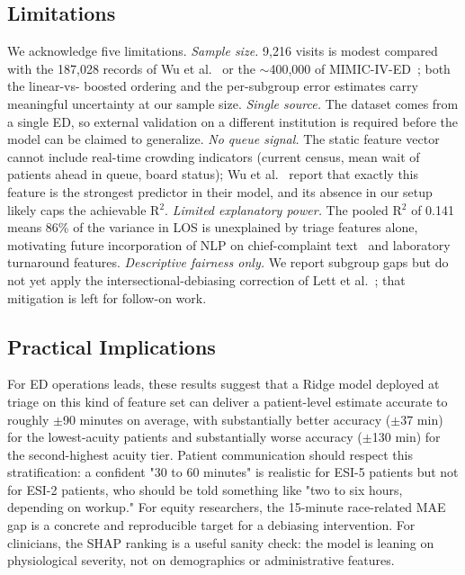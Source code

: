 \documentclass[conference]{IEEEtran}
\begin{document}
\subsection{Limitations}
We acknowledge five limitations. \textit{Sample size.} 9{,}216 visits is
modest compared with the 187{,}028 records of Wu et al.~\cite{wu2025} or
the $\sim$400{,}000 of MIMIC-IV-ED~\cite{xie2022}; both the linear-vs-
boosted ordering and the per-subgroup error estimates carry meaningful
uncertainty at our sample size. \textit{Single source.} The dataset comes
from a single ED, so external validation on a different institution is
required before the model can be claimed to generalize. \textit{No queue
signal.} The static feature vector cannot include real-time crowding
indicators (current census, mean wait of patients ahead in queue, board
status); Wu et al.~\cite{wu2025} report that exactly this feature is the
strongest predictor in their model, and its absence in our setup likely
caps the achievable R$^2$. \textit{Limited explanatory power.} The pooled
R$^2$ of 0.141 means 86\% of the variance in LOS is unexplained by triage
features alone, motivating future incorporation of NLP on chief-complaint
text~\cite{seo2024} and laboratory turnaround features. \textit{Descriptive
fairness only.} We report subgroup gaps but do not yet apply the
intersectional-debiasing correction of Lett et al.~\cite{lett2025}; that
mitigation is left for follow-on work.

\subsection{Practical Implications}
For ED operations leads, these results suggest that a Ridge model deployed
at triage on this kind of feature set can deliver a patient-level estimate
accurate to roughly $\pm$90 minutes on average, with substantially better
accuracy ($\pm$37 min) for the lowest-acuity patients and substantially
worse accuracy ($\pm$130 min) for the second-highest acuity tier. Patient
communication should respect this stratification: a confident "30 to 60
minutes" is realistic for ESI-5 patients but not for ESI-2 patients, who
should be told something like "two to six hours, depending on workup." For
equity researchers, the 15-minute race-related MAE gap is a concrete and
reproducible target for a debiasing intervention. For clinicians, the SHAP
ranking is a useful sanity check: the model is leaning on physiological
severity, not on demographics or administrative features.

\end{document}
